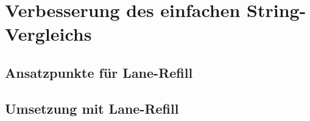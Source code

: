 \chapter{Verbesserung des einfachen String-Vergleichs}

\section{Ansatzpunkte für Lane-Refill}

\section{Umsetzung  mit Lane-Refill}

